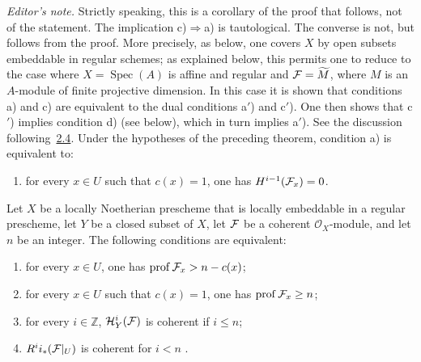 \setcounter{section}{2}
\setcounter{sourcecorollary}{1}
\begin{sourcecorollary}{\textit{Editor's note.} Strictly speaking, this is a
corollary of the proof that follows, not of the statement. The implication
\textup{c)}$\Rightarrow$\textup{a)} is tautological. The converse is not, but
follows from the proof. More precisely, as below, one covers $X$ by open
subsets embeddable in regular schemes; as explained below, this permits one to
reduce to the case where $X=\operatorname{Spec}(A)$ is affine and regular and
$\cF=\widetilde M$, where $M$ is an $A$-module of finite projective dimension.
In this case it is shown that conditions \textup{a)} and \textup{c)} are
equivalent to the dual conditions \textup{a$'$)} and \textup{c$'$)}. One then
shows that \textup{c$'$)} implies condition \textup{d)} (see below), which in
turn implies \textup{a$'$)}. See the discussion following~\hyperref[VIII.2.4]{2.4}.}\label{VIII.2.2}
Under the hypotheses of the preceding theorem, condition \textup{a)} is
equivalent to:
\begin{enumerate}[label=\textup{\alph*)},start=3,leftmargin=2.2em]
\item for every $x\in U$ such that $c(x)=1$, one has
  $H^{i-1}(\cF_x)=0$.
\end{enumerate}
\end{sourcecorollary}


\setcounter{section}{2}
\setcounter{sourcecorollary}{2}
\begin{sourcecorollary}\label{VIII.2.3}
Let $X$ be a locally Noetherian prescheme that is locally embeddable in a
regular prescheme, let $Y$ be a closed subset of $X$, let $\cF$ be a coherent
$\mathcal O_X$-module, and let $n$ be an integer. The following conditions are
equivalent:
\begin{enumerate}[label=\textup{(\roman*)},leftmargin=2.8em]
\item for every $x\in U$, one has
  $\prof \cF_x>n-c(x)$;
\item for every $x\in U$ such that $c(x)=1$, one has
  $\prof \cF_x\geq n$;
\item for every $i\in\mathbb Z$, $\mathcal H^i_Y(\cF)$ is coherent if
  $i\leq n$;
\item $R^i i_*(\cF|_U)$ is coherent for $i<n$%
  .
\end{enumerate}
\end{sourcecorollary}

